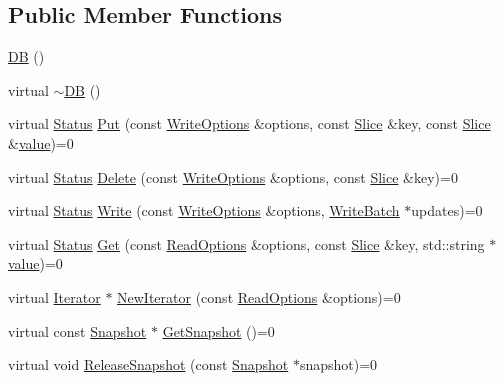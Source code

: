 \subsection*{Public Member Functions}
\begin{DoxyCompactItemize}
\item 
\hyperlink{classleveldb_1_1_d_b_a6b275339ff6194c598daf7091ad8d5c1}{D\+B} ()
\item 
virtual \hyperlink{classleveldb_1_1_d_b_a15f516eb9ec41812419a7160b4740a22}{$\sim$\+D\+B} ()
\item 
virtual \hyperlink{classleveldb_1_1_status}{Status} \hyperlink{classleveldb_1_1_d_b_ac2e472812630ed74298df7b03b08c1ae}{Put} (const \hyperlink{structleveldb_1_1_write_options}{Write\+Options} \&options, const \hyperlink{classleveldb_1_1_slice}{Slice} \&key, const \hyperlink{classleveldb_1_1_slice}{Slice} \&\hyperlink{cache_8cc_a0f61d63b009d0880a89c843bd50d8d76}{value})=0
\item 
virtual \hyperlink{classleveldb_1_1_status}{Status} \hyperlink{classleveldb_1_1_d_b_aff7577239799cd059464701c548090b9}{Delete} (const \hyperlink{structleveldb_1_1_write_options}{Write\+Options} \&options, const \hyperlink{classleveldb_1_1_slice}{Slice} \&key)=0
\item 
virtual \hyperlink{classleveldb_1_1_status}{Status} \hyperlink{classleveldb_1_1_d_b_ae0b6ded8c8e0b88ff70190bf7a0c086c}{Write} (const \hyperlink{structleveldb_1_1_write_options}{Write\+Options} \&options, \hyperlink{classleveldb_1_1_write_batch}{Write\+Batch} $\ast$updates)=0
\item 
virtual \hyperlink{classleveldb_1_1_status}{Status} \hyperlink{classleveldb_1_1_d_b_ad43bd7937b9af88ff856eb8158890911}{Get} (const \hyperlink{structleveldb_1_1_read_options}{Read\+Options} \&options, const \hyperlink{classleveldb_1_1_slice}{Slice} \&key, std\+::string $\ast$\hyperlink{cache_8cc_a0f61d63b009d0880a89c843bd50d8d76}{value})=0
\item 
virtual \hyperlink{classleveldb_1_1_iterator}{Iterator} $\ast$ \hyperlink{classleveldb_1_1_d_b_a5629308235de24c05c286c353d4e7d32}{New\+Iterator} (const \hyperlink{structleveldb_1_1_read_options}{Read\+Options} \&options)=0
\item 
virtual const \hyperlink{classleveldb_1_1_snapshot}{Snapshot} $\ast$ \hyperlink{classleveldb_1_1_d_b_a7d13f6336c7c5f0bf79578d57c45568c}{Get\+Snapshot} ()=0
\item 
virtual void \hyperlink{classleveldb_1_1_d_b_aa46de65e990bd179db0aee770af89144}{Release\+Snapshot} (const \hyperlink{classleveldb_1_1_snapshot}{Snapshot} $\ast$snapshot)=0

\end{DoxyCompactItemize}
